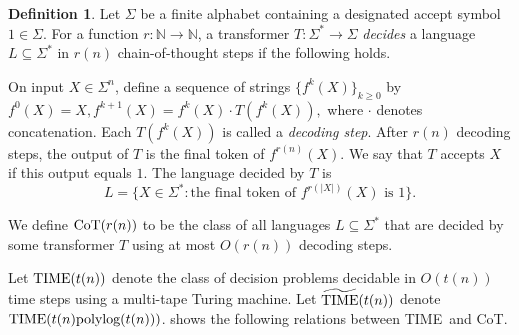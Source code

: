 \documentclass{article}
\theoremstyle{definition}
\newtheorem{definition}[theorem]{Definition}
\newcommand{\0}{\mathbf{0}}
\newcommand{\CoT}{\mbox{\rm CoT}}
\newcommand{\1}{\mathbbm{1}}
\newcommand{\TIME}{\mbox{\rm TIME}}
\newcommand{\polylog}{\text{polylog}}
\begin{document}





\begin{definition}
Let $\Sigma$ be a finite alphabet containing a designated accept symbol $1 \in \Sigma$. 
For a function $r:\mathbb{N}\to\mathbb{N}$, a transformer $T : \Sigma^* \to \Sigma$ \textit{decides }a language 
$L \subseteq \Sigma^*$ in $r(n)$ chain-of-thought steps if the following holds.

On input $X \in \Sigma^n$, define a sequence of strings $\{f^k(X)\}_{k\ge 0}$ by
$f^0(X) = X,
f^{k+1}(X) = f^k(X)\cdot T(f^k(X)),
$
where $\cdot$ denotes concatenation. Each $T(f^k(X))$ is called a \textit{decoding step}. After $r(n)$ decoding steps, the output of $T$ is the final token of $f^{r(n)}(X)$. We say that $T$ accepts $X$ if this output equals $1$. The language decided by $T$ is
\[
L = \{X \in \Sigma^* : \text{the final token of } f^{r(|X|)}(X) \text{ is } 1 \}.
\]

We define $\CoT(r(n))$ to be the class of all languages $L \subseteq \Sigma^*$ that are decided by some transformer $T$ using at most $O(r(n))$ decoding steps.
\end{definition}


Let $\TIME(t(n))$ denote the class of decision problems decidable in $O(t(n))$ time steps using a multi-tape Turing machine. Let $\widetilde{\TIME}(t(n))$ denote $\TIME(t(n)\polylog(t(n)))$. \cite{merrill2023expressive} shows the following relations between \TIME\ and \CoT.  
\end{document}
